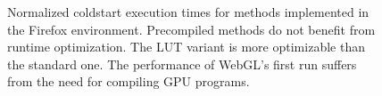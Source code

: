 \begin{figure}

    \label{plot:coldstart-Firefox}
    \caption{Normalized coldstart execution times for methods implemented in the Firefox environment. Precompiled methods do not benefit from runtime optimization. The LUT variant is more optimizable than the standard one. The performance of WebGL's first run suffers from the need for compiling GPU programs.}
\end{figure}

